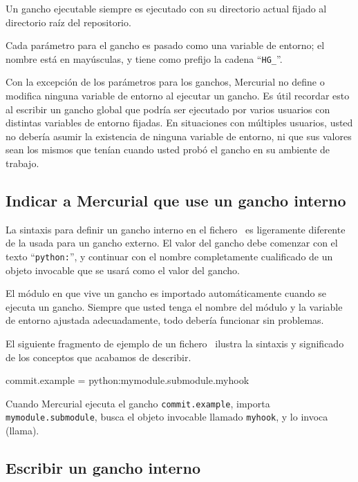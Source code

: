 Un gancho ejecutable siempre es ejecutado con su directorio actual
fijado al directorio raíz del repositorio.

Cada parámetro para el gancho es pasado como una variable de entorno;
el nombre está en mayúsculas, y tiene como prefijo la cadena
``\texttt{HG\_}''.

Con la excepción de los parámetros para los ganchos, Mercurial no
define o modifica ninguna variable de entorno al ejecutar un gancho.
Es útil recordar esto al escribir un gancho global que podría ser
ejecutado por varios usuarios con distintas variables de entorno
fijadas. En situaciones con múltiples usuarios, usted no debería
asumir la existencia de ninguna variable de entorno, ni que sus
valores sean los mismos que tenían cuando usted probó el gancho en su
ambiente de trabajo.

\subsection{Indicar a Mercurial que use un gancho interno}

La sintaxis para definir un gancho interno en el fichero \hgrc\ es
ligeramente diferente de la usada para un gancho externo. El valor del
gancho debe comenzar con el texto ``\texttt{python:}'', y continuar
con el nombre completamente cualificado de un objeto invocable que se
usará como el valor del gancho.

El módulo en que vive un gancho es importado automáticamente cuando se
ejecuta un gancho. Siempre que usted tenga el nombre del módulo y la
variable de entorno  ajustada adecuadamente, todo
debería funcionar sin problemas.

El siguiente fragmento de ejemplo de un fichero \hgrc\ ilustra la
sintaxis y significado de los conceptos que acabamos de describir.
\begin{codesample2}
  [hooks]
  commit.example = python:mymodule.submodule.myhook
\end{codesample2}
Cuando Mercurial ejecuta el gancho \texttt{commit.example}, importa 
\texttt{mymodule.submodule}, busca el objeto invocable llamado
\texttt{myhook}, y lo invoca (llama).

\subsection{Escribir un gancho interno}

